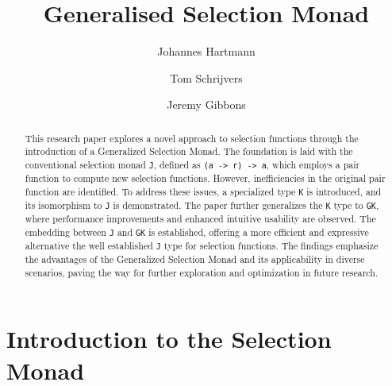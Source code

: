 \documentclass[runningheads]{llncs}
\newcommand{\ignore}[1]{}
\begin{document}
\title{Generalised Selection Monad}

\author{
    Johannes Hartmann \and 
    Tom Schrijvers\and 
    Jeremy Gibbons
}
%


%
\maketitle              %
%
\begin{abstract}
This research paper explores a novel approach to selection functions
through the introduction of a Generalized Selection Monad. The
foundation is laid with the conventional selection monad \texttt{J},
defined as \texttt{(a\ -\textgreater{}\ r)\ -\textgreater{}\ a}, which
employs a pair function to compute new selection functions. However,
inefficiencies in the original pair function are identified. To address
these issues, a specialized type \texttt{K} is introduced, and its
isomorphism to \texttt{J} is demonstrated. The paper further generalizes
the \texttt{K} type to \texttt{GK}, where performance improvements and
enhanced intuitive usability are observed. The embedding between
\texttt{J} and \texttt{GK} is established, offering a more efficient and
expressive alternative the well established \texttt{J} type for
selection functions. The findings emphasize the advantages of the
Generalized Selection Monad and its applicability in diverse scenarios,
paving the way for further exploration and optimization in future
research.

\end{abstract}
%
%
%
\ignore{

> {-# LANGUAGE ImpredicativeTypes #-}
> {-# LANGUAGE ScopedTypeVariables #-}

> import Prelude hiding ((>>=), return, pure, (<*>), fmap, sequence, Left, Right)

}

\section{Introduction to the Selection
Monad}\label{introduction-to-the-selection-monad}
\end{document}
